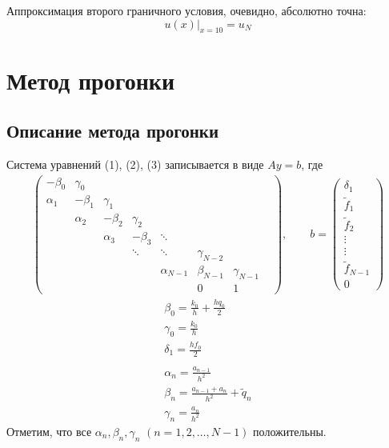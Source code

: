 \documentclass[titlepage]{article}
\begin{document}
Аппроксимация второго граничного условия, очевидно, абсолютно точна:
$$u(x)\big|_{x=10} = u_N$$
\section{Метод прогонки}
\subsection{Описание метода прогонки}
Система уравнений (1), (2), (3) записывается в виде $Ay = b$, где 
\begin{gather}
	\begin{pmatrix}
		-\beta_0 & \gamma_0 & & & & & \\
		\alpha_1 & -\beta_1 & \gamma_1 & & & & \\
		& \alpha_2 & -\beta_2 & \gamma_2 & & & \\
		& & \alpha_3 & -\beta_3 & \ddots & & & \\
		& & & \ddots & \ddots & \gamma_{N-2} & & \\
		& & & & \alpha_{N-1} & \beta_{N-1} & \gamma_{N-1} \\
		& & & & & 0 & 1
	\end{pmatrix}
	, \qquad b = 
	\begin{pmatrix}
		\delta_1 \\ \tilde f_1 \\ \tilde f_2 \\ \vdots \\ \vdots \\ \tilde f_{N-1} \\ 0	
	\end{pmatrix}	
\end{gather}
\begin{gather*}
	\beta_0 = \frac{k_0}{h} + \frac{hq_0}{2} \\
	\gamma_0 = \frac{k_0}{h} \\
	\delta_1 = \frac{hf_0}{2} \\
	\\
	\alpha_n = \frac{a_{n-1}}{h^2} \\ 
	\beta_n = \frac{a_{n-1} + a_n}{h^2} + \tilde q_n \\
	\gamma_n = \frac{a_n}{h^2}
\end{gather*}
Отметим, что все $\alpha_n, \beta_n, \gamma_n$ $(n = 1,2,\dots,N-1)$ положительны. 
\end{document}
